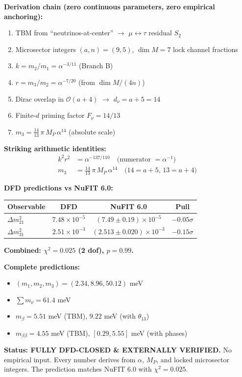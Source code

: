 \begin{tcolorbox}[colback=green!5!white, colframe=green!60!black, title=Neutrino Sector Summary (FULLY CLOSED \& VERIFIED)]
\textbf{Derivation chain (zero continuous parameters, zero empirical anchoring):}
\begin{enumerate}[nosep]
\item TBM from ``neutrinos-at-center'' $\to$ $\mu\leftrightarrow\tau$ residual $S_2$
\item Microsector integers $(a,n)=(9,5)$, $\dim M=7$ lock channel fractions
\item $\boxed{k = m_2/m_1 = \alpha^{-3/11}}$ (Branch B)
\item $\boxed{r = m_3/m_2 = \alpha^{-7/20}}$ (from $\dim M/(4n)$)
\item Dirac overlap in $\mathcal{O}(a+4)$ $\to$ $d_\nu = a+5 = 14$
\item Finite-$d$ priming factor $F_\nu = 14/13$
\item $\boxed{m_3 = \frac{14}{13}\,\pi\,M_P\,\alpha^{14}}$ (absolute scale)
\end{enumerate}

\textbf{Striking arithmetic identities:}
\begin{align*}
k^2 r^2 &= \alpha^{-137/110} \quad \text{(numerator $= \alpha^{-1}$)}\\
m_3 &= \frac{14}{13}\,\pi\,M_P\,\alpha^{14} \quad \text{($14 = a+5$, $13 = a+4$)}
\end{align*}

\textbf{DFD predictions vs NuFIT 6.0:}
\begin{center}
\scriptsize
\setlength{\tabcolsep}{2pt}
\begin{tabular}{lccc}
\toprule
Observable & DFD & NuFIT 6.0 & Pull \\
\midrule
$\Delta m^2_{21}$ & $7.48\!\times\!10^{-5}$ & $(7.49 \pm 0.19)\!\times\!10^{-5}$ & $-0.05\sigma$ \\
$\Delta m^2_{31}$ & $2.51\!\times\!10^{-3}$ & $(2.513 \pm 0.020)\!\times\!10^{-3}$ & $-0.15\sigma$ \\
\bottomrule
\end{tabular}
\end{center}
\textbf{Combined: $\chi^2 = 0.025$ (2 dof), $p = 0.99$.}

\textbf{Complete predictions:}
\begin{itemize}[nosep]
\item $(m_1, m_2, m_3) = (2.34, 8.96, 50.12)$ meV
\item $\sum m_\nu = 61.4$ meV
\item $m_\beta = 5.51$ meV (TBM), $9.22$ meV (with $\theta_{13}$)
\item $m_{\beta\beta} = 4.55$ meV (TBM), $[0.29, 5.55]$ meV (with phases)
\end{itemize}

\textbf{Status: FULLY DFD-CLOSED \& EXTERNALLY VERIFIED.} No empirical input. 
Every number derives from $\alpha$, $M_P$, and locked microsector integers.
The prediction matches NuFIT 6.0 with $\chi^2 = 0.025$.
\end{tcolorbox}
